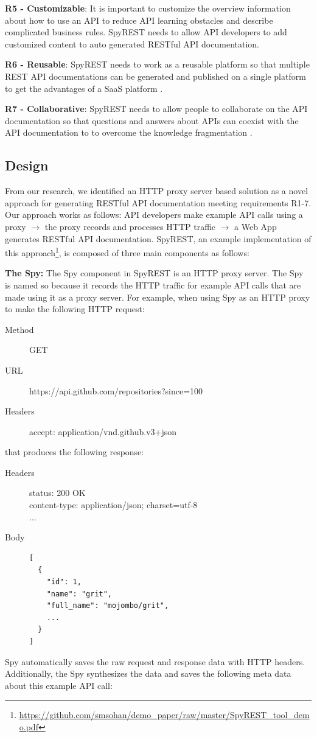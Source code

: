   \textbf{R5 - Customizable}: It is important to customize the overview information about how to use an API to reduce API learning obstacles and describe complicated business rules\cite{Robillard_what_makes}. SpyREST needs to allow API developers to add customized content to auto generated RESTful API documentation.

  \textbf{R6 - Reusable}: SpyREST needs to work as a reusable platform so that multiple REST API documentations can be generated and published on a single platform to get the advantages of a SaaS platform \cite{Stepalina_saas}.

  \textbf{R7 - Collaborative}: SpyREST needs to allow people to collaborate on the API documentation so that questions and answers about APIs can coexist with the API documentation to to overcome the knowledge fragmentation \cite{Chen_who_asked}.


\subsection{Design} %
From our research, we identified an HTTP proxy server based solution as a novel approach for generating RESTful API documentation meeting requirements R1-7. Our approach works as follows: API developers make example API calls using a proxy $\longrightarrow$ the proxy records and processes HTTP traffic $\longrightarrow$ a Web App generates RESTful API documentation. SpyREST, an example implementation of this approach\footnote{\url{https://github.com/smsohan/demo_paper/raw/master/SpyREST_tool_demo.pdf}}, is composed of three main components as follows:

\textbf{The Spy:} The Spy component in SpyREST is an HTTP proxy server. The Spy is named so because it records the HTTP traffic for example API calls that are made using it as a proxy server. For example, when using Spy as an HTTP proxy to make the following HTTP request:

\footnotesize
\begin{description}
  \item[Method] GET
  \item[URL] https://api.github.com/repositories?since=100
  \item[Headers] accept: application/vnd.github.v3+json
\end{description}
\normalsize
that produces the following response:
\footnotesize
\begin{description}
  \item[Headers] status: 200 OK \\
content-type: application/json; charset=utf-8 \\
...
  \item[Body]
\begin{lstlisting}
[
  {
    "id": 1,
    "name": "grit",
    "full_name": "mojombo/grit",
    ...
  }
]\end{lstlisting}
\end{description}
\normalsize
Spy automatically saves the raw request and response data with HTTP headers. Additionally, the Spy synthesizes the data and saves the following meta data about this example API call:

